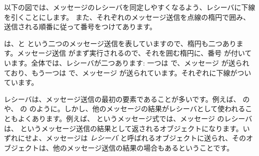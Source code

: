 \documentclass[a4paper,10pt,twoside]{book}
\begin{document}


以下の図では、メッセージのレシーバを同定しやすくなるよう、レシーバに下線を引くことにします。
また、それぞれのメッセージ送信を点線の楕円で囲み、送信される順番に従って番号をつけてあります。


 は、と  という二つのメッセージ送信を表していますので、楕円も二つあります。メッセージ送信  がまず実行されるので、それを囲む楕円に、番号  が付いています。全体では、レシーバが二つあります: 一つは  で、メッセージ  が送られており、もう一つは  で、メッセージ  が送られています。それぞれに下線がついています。

レシーバは、メッセージ送信の最初の要素であることが多いです。例えば、 の  や、 の のように。しかし、他のメッセージの結果がレシーバとして使われることもよくあります。例えば、 というメッセージ式では、メッセージ  のレシーバは、 というメッセージ送信の結果として返されるオブジェクトになります。いずれにせよ、メッセージは \emph{レシーバ} と呼ばれるオブジェクトに送られ、そのオブジェクトは、他のメッセージ送信の結果の場合もあるということです。
\end{document}
